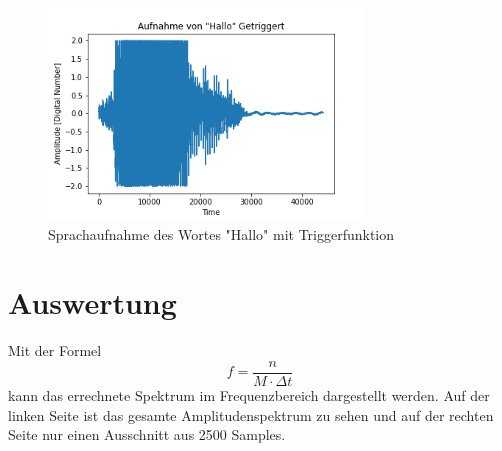 \documentclass[12pt, oneside, a4paper, \docLanguage]{report}
\begin{document}
\begin{figure}[H]
	\centering\small
	\includegraphics[width=0.75\textwidth]{media/AufnahmeHalloGetriggert.png}
	\caption{Sprachaufnahme des Wortes "Hallo" mit Triggerfunktion}
	\label{fig:VERSUCH_1_halloTriggered}
\end{figure}

\section{Auswertung}
\label{chap:VERSUCH_1_AUSWERTUNG}
Mit der Formel
\begin{equation*}
    f = \frac{n}{M \cdot \Delta t}
\end{equation*}
kann das errechnete Spektrum im Frequenzbereich dargestellt werden. Auf der linken Seite ist das gesamte Amplitudenspektrum zu sehen und auf der rechten Seite nur einen Ausschnitt aus 2500 Samples.
\end{document}
